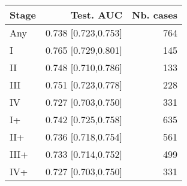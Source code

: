 \begin{table}[ht]
\centering
\begin{tabular}{lrr}
  \toprule
Stage & Test. AUC & Nb. cases \\ 
  \midrule
Any & 0.738 [0.723,0.753] & 764 \\ 
   \addlinespace
I & 0.765 [0.729,0.801] & 145 \\ 
  II & 0.748 [0.710,0.786] & 133 \\ 
  III & 0.751 [0.723,0.778] & 228 \\ 
  IV & 0.727 [0.703,0.750] & 331 \\ 
   \addlinespace
I+ & 0.742 [0.725,0.758] & 635 \\ 
  II+ & 0.736 [0.718,0.754] & 561 \\ 
  III+ & 0.733 [0.714,0.752] & 499 \\ 
  IV+ & 0.727 [0.703,0.750] & 331 \\ 
   \bottomrule
\end{tabular}
\end{table}
